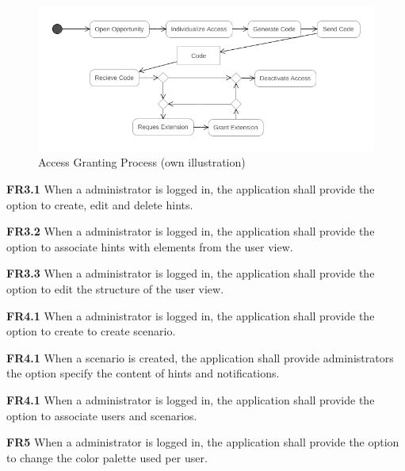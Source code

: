 \begin{figure}[H]
    \centering
    \includegraphics[width=\textwidth]{img/diagrams/Activity/Access Granting.png}
    \caption[Access Granting Process]{Access Granting Process (own illustration)}
    \label{fig:}
\end{figure}

\begin{closeItem}
    \item [\textbf{FR3.1}] When a administrator is logged in, the application shall provide the option to create, edit and delete hints.
    \item [\textbf{FR3.2}] When a administrator is logged in, the application shall provide the option to associate hints with elements from the user view.
    \item [\textbf{FR3.3}] When a administrator is logged in, the application shall provide the option to edit the structure of the user view.
\end{closeItem}

\begin{closeItem}
    \item [\textbf{FR4.1}] When a administrator is logged in, the application shall provide the option to create to create  scenario.
    \item [\textbf{FR4.1}] When a scenario is created, the application shall provide administrators the option specify the content of hints and notifications.
     \item [\textbf{FR4.1}] When a administrator is logged in, the application shall provide the option to associate users and scenarios.
\end{closeItem}

\begin{closeItem}
     \item [\textbf{FR5}] When a administrator is logged in, the application shall provide the option to change the color palette used per user.
\end{closeItem}

